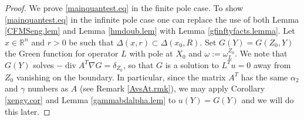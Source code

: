 \documentclass[11pt, a4paper,leqno]{amsart}
\theoremstyle{plain}
\theoremstyle{definition}
\theoremstyle{remark}
\numberwithin{equation}{section}
\newcommand{\rn}{\mathbb{R}^n}
\newcommand{\hm}{\omega}
\def\div{\mathop{\operatorname{div}}\nolimits}
\begin{document}
\begin{proof}
We prove \eqref{mainquantest.eq} in the finite pole case. To show \eqref{mainquantest.eq} in the infinite pole case one can replace the use of both Lemma \ref{CFMSeng.lem} and Lemma \ref{hmdoub.lem} with Lemma \ref{gfinftyfacts.lemma}.
Let $x \in \rn$ and $r >0$ be such that $\Delta(x,r) \subset \Delta(x_0,R)$. Set $G(Y) = G(Z_0, Y)$ the Green function for operator $L$ with pole at $X_0$ and $\hm:= \hm_L^{Z_0}$. We note that $G(Y)$ solves $-\div A^T \nabla G = \delta_{Z_0}$, so that $G$ is a solution to $L^Tu = 0$ away from $Z_0$ vanishing on the boundary. In particular, since the matrix $A^T$ has the same $\alpha_2$ and $\gamma$ numbers as $A$ (see Remark \ref{AvsAt.rmk}), we may apply Corollary \ref{xengy.cor} and Lemma \ref{gammabdalpha.lem} to $u(Y) = G(Y)$ and we will do this later.



\end{proof}
\end{document}
